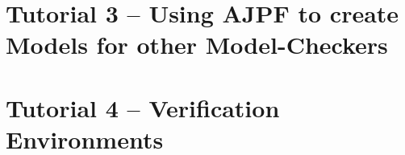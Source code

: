 \section{Tutorial 3 -- Using AJPF to create Models for other Model-Checkers}

{
  \let\section\subsection
  \let\subsection\subsubsection
  \let\subsubsection\paragraph


}

\section{Tutorial 4 -- Verification Environments}

{
  \let\section\subsection
  \let\subsection\subsubsection
  \let\subsubsection\paragraph


}


